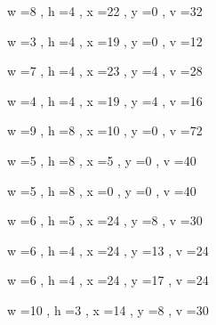\documentclass[11pt]{article}
\begin{document}
w =8 , h =4 , x =22 , y =0 , v =32
\par
w =3 , h =4 , x =19 , y =0 , v =12
\par
w =7 , h =4 , x =23 , y =4 , v =28
\par
w =4 , h =4 , x =19 , y =4 , v =16
\par
w =9 , h =8 , x =10 , y =0 , v =72
\par
w =5 , h =8 , x =5 , y =0 , v =40
\par
w =5 , h =8 , x =0 , y =0 , v =40
\par
w =6 , h =5 , x =24 , y =8 , v =30
\par
w =6 , h =4 , x =24 , y =13 , v =24
\par
w =6 , h =4 , x =24 , y =17 , v =24
\par
w =10 , h =3 , x =14 , y =8 , v =30
\par
\newpage
\end{document}
